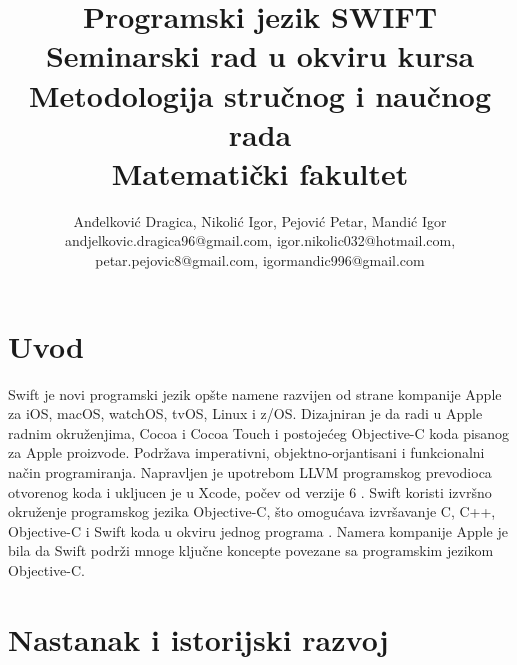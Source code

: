 \documentclass[a4paper]{article}
\begin{document}
\title{Programski jezik SWIFT\\ \small{Seminarski rad u okviru kursa\\Metodologija stručnog i naučnog rada\\ Matematički fakultet}}

\author{Anđelković Dragica, Nikolić Igor, Pejović Petar, Mandić Igor\\ andjelkovic.dragica96@gmail.com, igor.nikolic032@hotmail.com,\\ petar.pejovic8@gmail.com, igormandic996@gmail.com}


\maketitle



\tableofcontents

\newpage

\section{Uvod}
\label{sec:uvod}
Swift je novi programski jezik opšte namene razvijen od strane kompanije Apple za iOS, macOS, watchOS, tvOS, Linux i z/OS. Dizajniran je da radi u Apple radnim okruženjima, Cocoa i Cocoa Touch i postojećeg Objective-C koda pisanog za Apple proizvode. Podržava imperativni, objektno-orjantisani i funkcionalni način programiranja. Napravljen je upotrebom LLVM programskog prevodioca otvorenog koda i ukljucen je u Xcode, počev od verzije 6 \cite{swift_sajt}. Swift koristi izvršno okruženje programskog jezika Objective-C, što omogućava izvršavanje C, C++, Objective-C i Swift koda u okviru jednog programa \cite{arc_sajt}.
Namera kompanije Apple je bila da Swift podrži mnoge ključne koncepte povezane sa programskim jezikom Objective-C.




\section{Nastanak i istorijski razvoj}
\label{sec:prviDeo}
\end{document}
